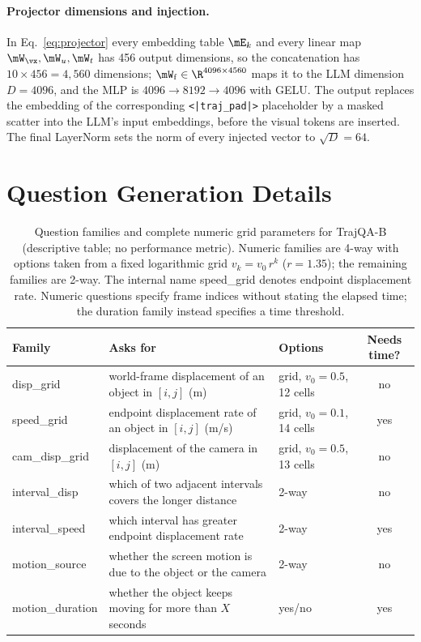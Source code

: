 \paragraph{Projector dimensions and injection.}
In Eq.~\ref{eq:projector} every embedding table $\mE_k$ and every linear map $\mW_{\vx},\mW_u,\mW_t$ has 456 output dimensions, so the concatenation has $10\times456=4{,}560$ dimensions; $\mW_{\mathrm{f}}\in\R^{4096\times4560}$ maps it to the LLM dimension $D=4096$, and the MLP is $4096\to8192\to4096$ with GELU.
The output replaces the embedding of the corresponding \texttt{<|traj\_pad|>} placeholder by a masked scatter into the LLM's input embeddings, before the visual tokens are inserted.
The final LayerNorm sets the norm of every injected vector to $\sqrt{D}=64$.

\section{Question Generation Details}
\label{app:qa}

\begin{table}[t]
\caption{Question families and complete numeric grid parameters for TrajQA-B (descriptive table; no performance metric). Numeric families are 4-way with options taken from a fixed logarithmic grid $v_k=v_0\,r^{k}$ ($r=1.35$); the remaining families are 2-way. The internal name speed\_grid denotes endpoint displacement rate. Numeric questions specify frame indices without stating the elapsed time; the duration family instead specifies a time threshold.}
\label{tab:qa-families}
\begin{center}
\footnotesize
\setlength{\tabcolsep}{4pt}
\begin{tabular}{lp{5.6cm}lc}
\toprule
\textbf{Family} & \textbf{Asks for} & \textbf{Options} & \textbf{Needs time?} \\
\midrule
disp\_grid & world-frame displacement of an object in $[i,j]$ (m) & grid, $v_0=0.5$, 12 cells & no \\
speed\_grid & endpoint displacement rate of an object in $[i,j]$ (m/s) & grid, $v_0=0.1$, 14 cells & yes \\
cam\_disp\_grid & displacement of the camera in $[i,j]$ (m) & grid, $v_0=0.5$, 13 cells & no \\
interval\_disp & which of two adjacent intervals covers the longer distance & 2-way & no \\
interval\_speed & which interval has greater endpoint displacement rate & 2-way & yes \\
motion\_source & whether the screen motion is due to the object or the camera & 2-way & no \\
motion\_duration & whether the object keeps moving for more than $X$ seconds & yes/no & yes \\
\bottomrule
\end{tabular}
\end{center}
\end{table}


